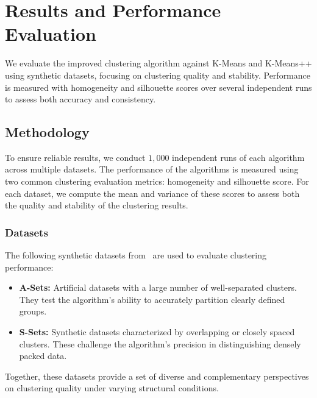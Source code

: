 \documentclass[10pt,twocolumn,letterpaper]{article}
\begin{document}

\section{Results and Performance Evaluation}\label{sec:results-and-performance-evaluation}

We evaluate the improved clustering algorithm against K-Means and K-Means++
using synthetic datasets, focusing on clustering quality and stability.
Performance is measured with homogeneity and silhouette scores over several
independent runs to assess both accuracy and consistency.


\subsection{Methodology}\label{subsec:methodology}

To ensure reliable results, we conduct $1,000$ independent runs of each
algorithm across multiple datasets. The performance of the algorithms is
measured using two common clustering evaluation metrics: homogeneity and
silhouette score. For each dataset, we compute the mean and variance of these
scores to assess both the quality and stability of the clustering results.

\subsubsection{Datasets}

The following synthetic datasets from~\cite{ClusteringDatasets} are used to
evaluate clustering performance:

\begin{itemize}
    \item \textbf{A-Sets:} Artificial datasets with a large number of well-separated clusters. They test the algorithm’s ability to accurately partition clearly defined groups.
    \item \textbf{S-Sets:} Synthetic datasets characterized by overlapping or closely spaced clusters. These challenge the algorithm’s precision in distinguishing densely packed data.
\end{itemize}
Together, these datasets provide a set of
diverse and complementary perspectives on clustering
quality under varying structural conditions.
\end{document}
